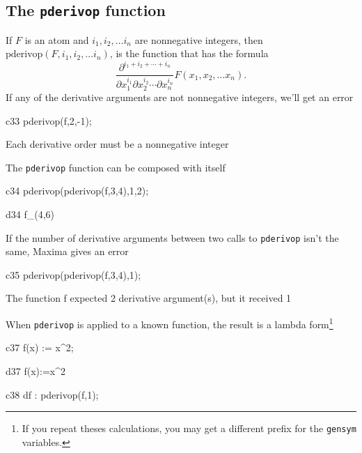 \documentclass[12pt]{article}
\begin{document}
\subsection*{The {\tt pderivop} function}

If $F$ is an atom and $i_1, i_2, \dots i_n$ are nonnegative
integers, then $ \mbox{pderivop}(F,i_1,i_2, \dots i_n)$, is the 
function that has the formula 
\[
   \frac{\partial^{i_1 + i_2 + \cdots + i_n}}{\partial x_1^{i_1} 
     \partial x_2^{i_2}  \cdots \partial x_n^{i_n}} F(x_1,x_2, \dots x_n). 
\]
If any of the derivative arguments are not nonnegative integers,
we'll get an error


\begin{mcline}{c33}
     pderivop(f,2,-1);
\end{mcline}

Each derivative order must be a nonnegative integer


\noindent The {\tt pderivop} function can be composed with itself

\begin{mcline}{c34}
     pderivop(pderivop(f,3,4),1,2);
\end{mcline}



\begin{mdline}{d34}
   f_{\left(4,6\right)}
\end{mdline}
\noindent If the number of derivative arguments between two calls 
to {\tt pderivop} isn't the same, Maxima gives an error

\begin{mcline}{c35}
     pderivop(pderivop(f,3,4),1);
\end{mcline}

The function f expected 2 derivative argument(s), but it received 1


When {\tt pderivop} is applied to a known function, the result is
a lambda form\footnote{If you repeat theses calculations, you 
may get a different prefix for the {\tt gensym} variables.}

\begin{mcline}{c37}
      f(x) := x^2;
\end{mcline}



\begin{mdline}{d37}
   f\left(x\right):=x^2
\end{mdline}

\begin{mcline}{c38}
   df : pderivop(f,1);
\end{mcline}
\end{document}
